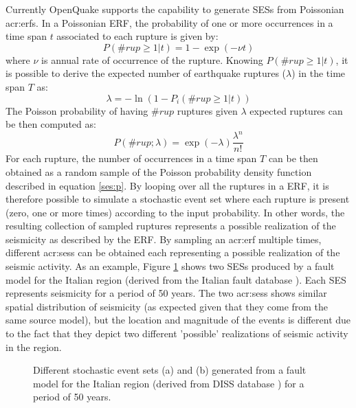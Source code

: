 Currently OpenQuake supports the capability to generate SESs from 
Poissonian \glspl{acr:erf}. In a Poissonian ERF, the probability of one
or more occurrences in a time span $t$ associated to each rupture is 
given by:
%
\begin{equation}
P(\#rup\geq1|t) = 1 - \exp(-\nu t)
\end{equation} 
where $\nu$ is annual rate of occurrence of the rupture. Knowing 
$P(\#rup\geq1|t)$, it is possible to derive the expected number of 
earthquake ruptures ($\lambda$) in the time span $T$  as:
\begin{equation}
\lambda = - \ln(1 - P_{i}(\#rup\geq1|t))
\end{equation} 
The Poisson probability of having $\#rup$ ruptures given $\lambda$ 
expected ruptures can be then computed as:
%
\begin{equation}
P(\#rup;\lambda) = \exp(-\lambda)\frac{\lambda^{n}}{n!}
\label{ses:p}
\end{equation}
%
For each rupture, the number of occurrences in a time span $T$ 
can be then obtained as a random sample of the Poisson probability 
density function described in equation \ref{ses:p}. By looping over
all the ruptures in a ERF, it is therefore possible to simulate a 
stochastic event set where each rupture is present (zero, one or 
more times) according to the input probability. 
%
In other words, the resulting collection of sampled ruptures represents 
a possible realization of the seismicity as described by the ERF. 
%
By sampling an \gls{acr:erf} multiple times, different \glspl{acr:ses} 
can be obtained each representing a possible realization of the seismic 
activity. 
As an example, Figure \ref{ses_italy} shows two SESs produced by a 
fault model for the Italian region (derived from the Italian fault 
database \citep{basili2008}). 
%
Each SES represents seismicity for a period of 50 years. The two 
\glspl{acr:ses} shows similar spatial distribution of seismicity (as 
expected given that they come from the same source model), but the 
location and magnitude of the events is different due to the fact that 
they depict two different 'possible' realizations of seismic activity 
in the region.
\begin{figure}[!htbp]
\begin{center}
\caption{Different stochastic event sets (a) and (b) generated from a 
fault model for the Italian region (derived from DISS database 
\citep{basili2008}) for a period of 50 years.}
\label{ses_italy}
\end{center}
\end{figure}
%

